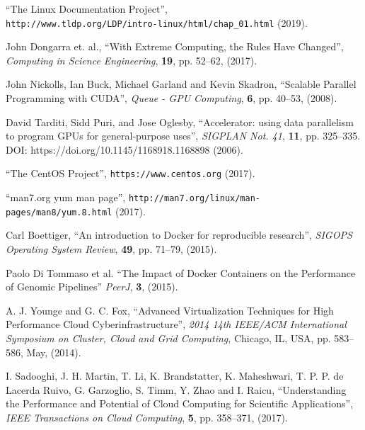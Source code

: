 \documentclass[twoside,a4paper,12pt,english]{inac19}
\begin{document}

\begin{thebibliography}{99} %

 ``The Linux Documentation Project'', \\\verb#http://www.tldp.org/LDP/intro-linux/html/chap_01.html# (2019).

 John Dongarra et. al., ``With Extreme Computing, the Rules Have Changed'', \textit{Computing in Science Engineering}, \textbf{19}, pp. 52--62, (2017).

 John Nickolls, Ian Buck, Michael Garland and Kevin Skadron, ``Scalable Parallel Programming with CUDA'', \textit{Queue - GPU Computing}, \textbf{6}, pp. 40--53, (2008).

 David Tarditi, Sidd Puri, and Jose Oglesby, ``Accelerator: using data parallelism to program GPUs for general-purpose uses'',  \textit{SIGPLAN Not. 41}, \textbf{11}, pp. 325--335. DOI: https://doi.org/10.1145/1168918.1168898 (2006).

  
 ``The CentOS Project'', \verb#https://www.centos.org# (2017).

 ``man7.org yum man page'', \verb#http://man7.org/linux/man-pages/man8/yum.8.html# (2017).
  
 Carl Boettiger, ``An introduction to Docker for reproducible research'', \textit{SIGOPS Operating System Review}, \textbf{49}, pp. 71--79, (2015).

 Paolo Di Tommaso et al. ``The Impact of Docker Containers on the Performance of Genomic Pipelines'' \textit{PeerJ}, \textbf{3}, (2015).

 A. J. Younge and G. C. Fox, ``Advanced Virtualization Techniques for High Performance Cloud Cyberinfrastructure'', \textit{2014 14th IEEE/ACM International Symposium on Cluster, Cloud and Grid Computing}, Chicago, IL, USA, pp. 583--586, May, (2014).
  
 I. Sadooghi, J. H. Martin, T. Li, K. Brandstatter, K. Maheshwari, T. P. P. de Lacerda Ruivo, G. Garzoglio, S. Timm, Y. Zhao and I. Raicu, ``Understanding the Performance and Potential of Cloud Computing for Scientific Applications'', \textit{IEEE Transactions on Cloud Computing}, \textbf{5}, pp. 358--371, (2017).
  

\end{thebibliography}
\end{document}
